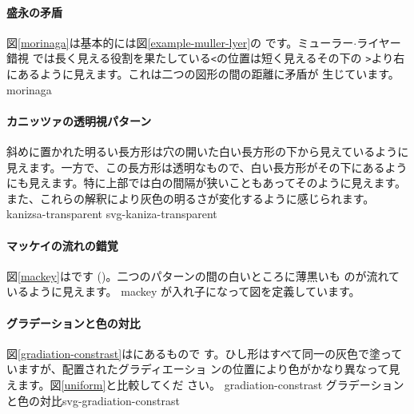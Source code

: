 \paragraph{盛永の矛盾}
図\ref{morinaga}は基本的には図\ref{example-muller-lyer}の
です。ミューラー$\cdot$ライヤー錯視
では長く見える役割を果たしている\texttt{<}の位置は短く見えるその下の
\texttt{>}より右にあるように見えます。これは二つの図形の間の距離に矛盾が
生じています。
{}{morinaga}
\iffalse\else
\paragraph{カニッツァの透明視パターン}
斜めに置かれた明るい長方形は穴の開いた白い長方形の下から見えているように
見えます。一方で、この長方形は透明なもので、白い長方形がその下にあるよう
にも見えます。特に上部では白の間隔が狭いこともあってそのように見えます。
また、これらの解釈により灰色の明るさが変化するように感じられます。
{}{kanizsa-transparent}
{svg-kaniza-transparent}
\fi
\paragraph{マッケイの流れの錯覚}
図\ref{mackey}はです
(\cite[49ページ図5.5]{Ninio})。二つのパターンの間の白いところに薄黒いも
のが流れているように見えます。
{}{mackey}
{\noexpand{}が入れ子になって図を定義しています。}
\paragraph{グラデーションと色の対比}
図\ref{gradiation-constrast}は\cite[185ページ図17.4]{Ninio}にあるもので
す。ひし形はすべて同一の灰色で塗っていますが、配置されたグラディエーショ
ンの位置により色がかなり異なって見えます。図\ref{uniform}と比較してくだ
さい。
{}{gradiation-constrast}
     {グラデーションと色の対比}{svg-gradiation-constrast}
